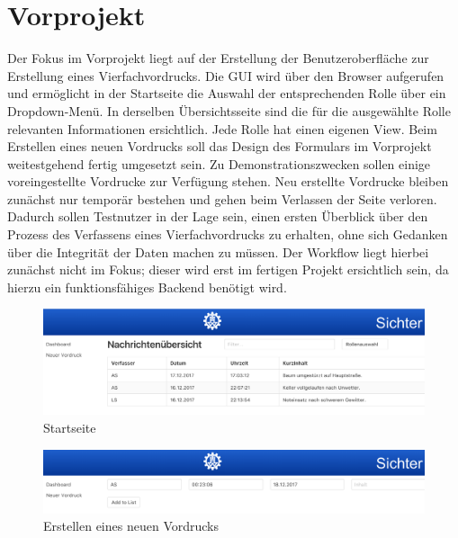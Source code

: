 \section{Vorprojekt}
Der Fokus im Vorprojekt liegt auf der Erstellung der Benutzeroberfläche zur Erstellung eines Vierfachvordrucks. 
Die GUI wird über den Browser aufgerufen und ermöglicht in der Startseite die Auswahl der entsprechenden Rolle über 
ein Dropdown-Menü. In derselben Übersichtsseite sind die für die ausgewählte Rolle relevanten Informationen ersichtlich. 
Jede Rolle hat einen eigenen View. Beim Erstellen eines neuen Vordrucks soll das Design des Formulars im Vorprojekt 
weitestgehend fertig umgesetzt sein. Zu Demonstrationszwecken sollen einige voreingestellte Vordrucke zur Verfügung stehen. Neu erstellte Vordrucke bleiben zunächst nur temporär bestehen und gehen beim Verlassen der Seite verloren. Dadurch sollen Testnutzer in der Lage sein, einen ersten Überblick über den Prozess des Verfassens eines Vierfachvordrucks zu erhalten,
ohne sich Gedanken über die Integrität der Daten machen zu müssen. Der Workflow liegt hierbei zunächst nicht im Fokus; dieser wird erst im fertigen Projekt ersichtlich sein, da hierzu ein funktionsfähiges Backend benötigt wird.

    \begin{figure}[htpb]
        \centering
        \includegraphics[width=0.95\linewidth]{vorprojekt_01.png}
        \caption{Startseite}
    \end{figure}


    \begin{figure}[htpb]
        \centering
        \includegraphics[width=0.95\linewidth]{vorprojekt_02.png}
        \caption{Erstellen eines neuen Vordrucks}
    \end{figure}
